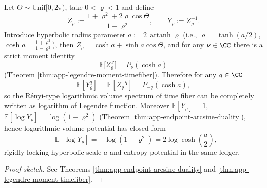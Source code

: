 \begin{conclusion}\label{con:xi-terminal-timefiber-legendre-renyi-spectrum}
Let \(\Theta\sim\mathrm{Unif}[0,2\pi)\), take \(0<\varrho<1\) and define
\[
Z_{\varrho}:=\frac{1+\varrho^2+2\varrho\cos\Theta}{1-\varrho^2},
\qquad
Y_{\varrho}:=Z_{\varrho}^{-1}.
\]
Introduce hyperbolic radius parameter \(a:=2\,\operatorname{artanh}\varrho\) (i.e., \(\varrho=\tanh(a/2)\), \(\cosh a=\frac{1+\varrho^{2}}{1-\varrho^{2}}\)), then \(Z_{\varrho}=\cosh a+\sinh a\cos\Theta\), and for any \(\nu\in\CC\) there is a strict moment identity
\[
\mathbb{E}\bigl[Z_{\varrho}^{\,\nu}\bigr]=P_{\nu}(\cosh a)
\]
(Theorem \ref{thm:app-legendre-moment-timefiber}).
Therefore for any \(q\in\CC\)
\[
\mathbb{E}[Y_{\varrho}^{q}]=\mathbb{E}[Z_{\varrho}^{-q}]=P_{-q}(\cosh a),
\]
so the Rényi-type logarithmic volume spectrum of time fiber can be completely written as logarithm of Legendre function.
Moreover
\(
\mathbb{E}[Y_{\varrho}]=1
\),
\(
\mathbb{E}[\log Y_{\varrho}]=\log(1-\varrho^{2})
\)
(Theorem \ref{thm:app-endpoint-arcsine-duality}), hence logarithmic volume potential has closed form
\[
-\mathbb{E}[\log Y_{\varrho}]=-\log(1-\varrho^2)=2\log\cosh\!\left(\frac{a}{2}\right),
\]
rigidly locking hyperbolic scale \(a\) and entropy potential in the same ledger.
\end{conclusion}
\begin{proof}[Proof sketch]
See Theorems \ref{thm:app-endpoint-arcsine-duality} and \ref{thm:app-legendre-moment-timefiber}.
\end{proof}


